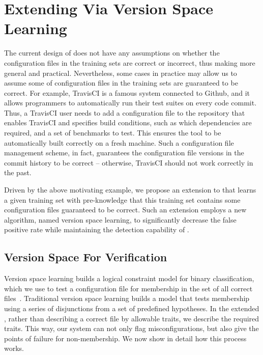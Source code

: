 
\section{Extending \app Via Version Space Learning}
\label{sec:travis}

The current design of \app does not have any assumptions on whether the
configuration files in the training sets are correct or 
incorrect, thus making \app more general and practical.
Nevertheless, some cases in practice 
may allow us to assume some of configuration 
files in the training sets are guaranteed to be correct.
For example, TravisCI is a famous system connected 
to Github, and it allows programmers to automatically run 
their test suites on every code commit. 
Thus, a TravisCI user needs to add a configuration file 
to the repository that 
enables TravisCI and specifies build conditions, 
such as which dependencies are required, 
and a set of benchmarks to test. This ensures 
the tool to be automatically built correctly on a fresh machine.
Such a configuration file management scheme, in fact, guarantees 
the configuration file versions in the commit history to be 
correct -- otherwise, TravisCI should not work correctly in the past.

Driven by the above motivating example, 
we propose an extension to \app that
learns a given training set with pre-knowledge that 
this training set contains some configuration files 
guaranteed to be correct.
Such an extension employs a new algorithm, named version space learning,
to significantly decrease the false positive rate while maintaining 
the detection capability of \app.

\subsection{Version Space For Verification}

Version space learning builds a logical constraint model for binary
classification, which we use to test a configuration file for membership
in the set of all correct files~\cite{mitchell82}.
Traditional version space learning builds a model that tests membership
using a series of disjunctions from a set of predefined hypotheses.
In the extended \app, rather than describing a correct file by allowable 
traits, we describe the required traits. 
This way, our system can not only flag misconfigurations, 
but also give the points of failure for non-membership.
We now show in detail how this process works.

